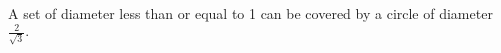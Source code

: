 A set of diameter less than or equal to 1 can be covered by a circle of
diameter $ \frac{2}{\sqrt{3}} . $
